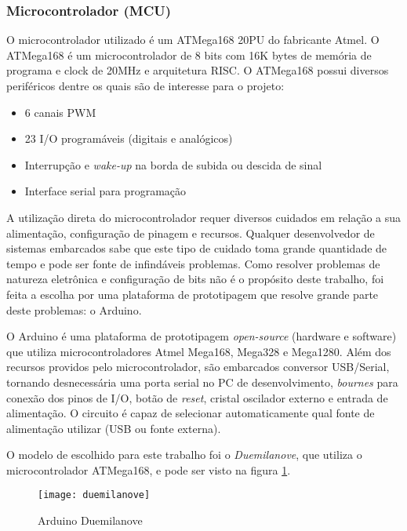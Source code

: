 \documentclass[a4paper,11pt]{article}
\begin{document}
\subsubsection{Microcontrolador (MCU)}
\label{sec:mcu}
O microcontrolador utilizado é um ATMega168 20PU do fabricante
Atmel\textsuperscript{\textregistered}. O ATMega168\cite{atmega} é um
microcontrolador de 8 bits com 16K bytes de memória de programa e clock de 20MHz
e arquitetura RISC. O ATMega168 possui diversos periféricos dentre os quais são
de interesse para o projeto:
\begin{itemize}
  \item 6 canais PWM
  \item 23 I/O programáveis (digitais e analógicos)
  \item Interrupção e \textit{wake-up} na borda de subida ou descida de sinal
  \item Interface serial para programação
\end{itemize}

A utilização direta do microcontrolador requer diversos cuidados em relação a
sua alimentação, configuração de pinagem e recursos. Qualquer desenvolvedor de
sistemas embarcados sabe que este tipo de cuidado toma grande quantidade de
tempo e pode ser fonte de infindáveis problemas. Como resolver problemas de
natureza eletrônica e configuração de bits não é o propósito deste trabalho,
foi feita a escolha por uma plataforma de prototipagem que resolve grande parte
deste problemas: o Arduino\cite{arduino}\cite{oxer2009practical}.

O Arduino é uma plataforma de prototipagem \textit{open-source} (hardware e
software) que utiliza microcontroladores Atmel Mega168, Mega328 e Mega1280. Além
dos recursos providos pelo microcontrolador, são embarcados conversor
USB/Serial, tornando desnecessária uma porta serial no PC de desenvolvimento,
\textit{bournes} para conexão dos pinos de I/O, botão de \textit{reset},
cristal oscilador externo e entrada de alimentação. O circuito é capaz
de selecionar automaticamente qual fonte de alimentação utilizar (USB ou fonte
externa).

O modelo de escolhido para este trabalho foi o \textit{Duemilanove}, que
utiliza o microcontrolador ATMega168, e pode ser visto na figura
\ref{fig:duemilanove}.
\begin{figure}[h]
\begin{center}
 \texttt{[image: duemilanove]}
\end{center}
  \caption{Arduino Duemilanove}
  \label{fig:duemilanove}
\end{figure}
\end{document}
